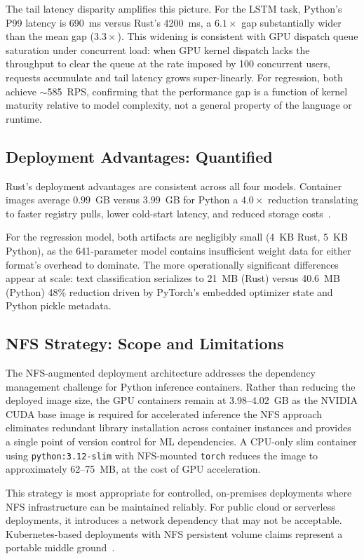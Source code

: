 \documentclass{ieeeaccess}
\begin{document}
The tail latency disparity amplifies this picture. For the LSTM task, Python's P99 latency is 690~ms versus Rust's 4200~ms, a $6.1\times$ gap substantially wider than the mean gap ($3.3\times$). This widening is consistent with GPU dispatch queue saturation under concurrent load: when GPU kernel dispatch lacks the throughput to clear the queue at the rate imposed by 100 concurrent users, requests accumulate and tail latency grows super-linearly. For regression, both achieve $\sim$585~RPS, confirming that the performance gap is a function of kernel maturity relative to model complexity, not a general property of the language or runtime.

\subsection{Deployment Advantages: Quantified}

Rust's deployment advantages are consistent across all four models. Container images average $0.99$~GB versus $3.99$~GB for Python a $4.0\times$ reduction translating to faster registry pulls, lower cold-start latency, and reduced storage costs~\cite{vasiliev2024scaling}.

For the regression model, both artifacts are negligibly small (4~KB Rust, 5~KB Python), as the 641-parameter model contains insufficient weight data for either format's overhead to dominate. The more operationally significant differences appear at scale: text classification serializes to 21~MB (Rust) versus 40.6~MB (Python) 48\% reduction driven by PyTorch's embedded optimizer state and Python pickle metadata.

\subsection{NFS Strategy: Scope and Limitations}

The NFS-augmented deployment architecture addresses the dependency management challenge for Python inference containers. Rather than reducing the deployed image size, the GPU containers remain at 3.98--4.02~GB as the NVIDIA CUDA base image is required for accelerated inference the NFS approach eliminates redundant library installation across container instances and provides a single point of version control for ML dependencies. A CPU-only slim container using \texttt{python:3.12-slim} with NFS-mounted \texttt{torch} reduces the image to approximately 62--75~MB, at the cost of GPU acceleration.

This strategy is most appropriate for controlled, on-premises deployments where NFS infrastructure can be maintained reliably. For public cloud or serverless deployments, it introduces a network dependency that may not be acceptable. Kubernetes-based deployments with NFS persistent volume claims represent a portable middle ground~\cite{k8sml2024}.
\end{document}
